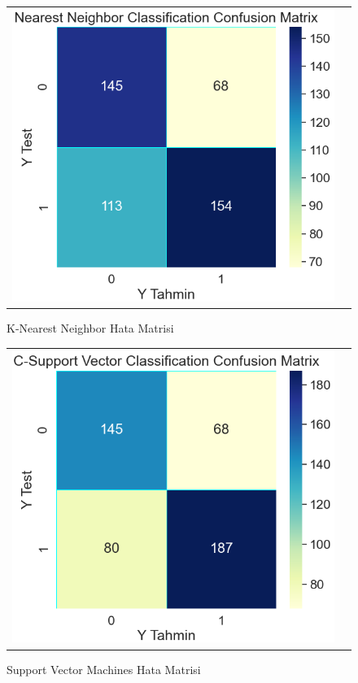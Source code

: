 \documentclass[conference]{IEEEtran}
\begin{document}
\begin{figure}[!h]
	\centering
	\begin{center}
		\begin{tabular}{cc}
			\includegraphics[scale=0.39]{pictures/pic_09.png}&
		\end{tabular}
	\end{center}
	\caption{K-Nearest Neighbor Hata Matrisi}
	\label{fig:09}
\end{figure}
\newpage
\begin{figure}[!h]
	\centering
	\begin{center}
		\begin{tabular}{cc}
			\includegraphics[scale=0.4]{pictures/pic_10.png}&
		\end{tabular}
	\end{center}
	\caption{Support Vector Machines Hata Matrisi}
	\label{fig:10}
\end{figure}
\end{document}
